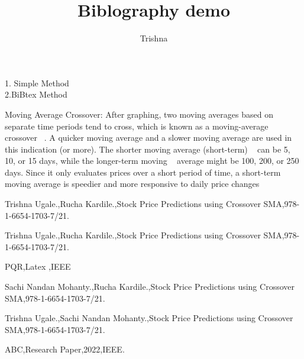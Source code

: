\documentclass[11pt,a4paper]{report}
\author{Trishna}
\title{Biblography demo}
\begin{document}
\maketitle

1. Simple Method\\
2.BiBtex Method

Moving Average Crossover: After graphing, two 
moving averages based on separate time periods tend to cross, 
which is known as a moving-average crossover ~\cite{abc}. A quicker 
moving average and a slower moving average are used in this 
indication (or more). The shorter moving average (short-term) ~\cite{pqr}
can be 5, 10, or 15 days, while the longer-term moving ~\cite{aa,trishna}
average might be 100, 200, or 250 days. Since it only 
evaluates prices over a short period of time, a short-term 
moving average is speedier and more responsive to daily 
price changes ~\cite{trishna,sachi,rucha}


\begin{thebibliography} {}

Trishna Ugale.,Rucha Kardile.,Stock Price Predictions using Crossover SMA,978-1-6654-1703-7/21.

 Trishna Ugale.,Rucha Kardile.,Stock Price Predictions using Crossover SMA,978-1-6654-1703-7/21.

 PQR,Latex ,IEEE

 Sachi Nandan Mohanty.,Rucha Kardile.,Stock Price Predictions using Crossover SMA,978-1-6654-1703-7/21.

 Trishna Ugale.,Sachi Nandan Mohanty.,Stock Price Predictions using Crossover SMA,978-1-6654-1703-7/21.

 ABC,Research Paper,2022,IEEE.



\end{thebibliography} 
\end{document}
